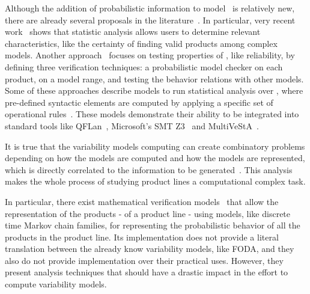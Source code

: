 Although the addition of probabilistic information to model \SPLs\ is relatively new, there are already several proposals in the literature~\cite{chssgl13,tllv15,tlll15,dpcslsh17}. In particular, very recent
work~\cite{dpcslsh17} shows that statistic analysis allows users to determine relevant characteristics, like the certainty of finding valid products among complex models.
%
Another approach~\cite{chssgl13} focuses on testing properties of \SPLs, like reliability, by defining three verification techniques: a probabilistic model checker on each product, on a model range, and testing the behavior relations with other models.
%
Some of these approaches describe models to run statistical analysis over \SPLs, where pre-defined syntactic elements are computed by applying a specific set of operational rules~\cite{tllv15,tlll15}. These models demonstrate their ability to be integrated into standard tools like QFLan~\cite{tlll15}, Microsoft's SMT Z3~\cite{ln08} and MultiVeStA~\cite{sa13}.
%
%

It is true that the variability models computing can create combinatory problems
depending on how the models are computed and how the models are represented, which is directly
correlated to the information to be generated~\cite{dpcslsh17}.
This analysis makes the whole process of studying product lines a computational complex task.

In particular, there exist mathematical verification models~\cite{vk13} that
allow the representation of the products - of a product line - using models,
like discrete time Markov chain families, for representing the probabilistic behavior of all
the products in the product line. Its implementation does not
provide a literal translation between the already know variability models, like FODA,
and they also do not provide implementation over their practical uses.
However, they present analysis techniques that should have
a drastic impact in the effort to compute variability models.

